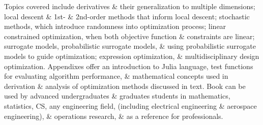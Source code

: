 \documentclass{article}
\begin{document}
Topics covered include derivatives \& their generalization to multiple dimensions; local descent \& 1st- \& 2nd-order methods that inform local descent; stochastic methods, which introduce randomness into optimization process; linear constrained optimization, when both objective function \& constraints are linear; surrogate models, probabilistic surrogate models, \& using probabilistic surrogate models to guide optimization; expression optimization, \& multidisciplinary design optimization. Appendixes offer an introduction to Julia language, test functions for evaluating algorithm performance, \& mathematical concepts used in derivation \& analysis of optimization methods discussed in text. Book can be used by advanced undergraduates \& graduates students in mathematics, statistics, CS, any engineering field, (including electrical engineering \& aerospace engineering), \& operations research, \& as a reference for professionals.
\end{document}
